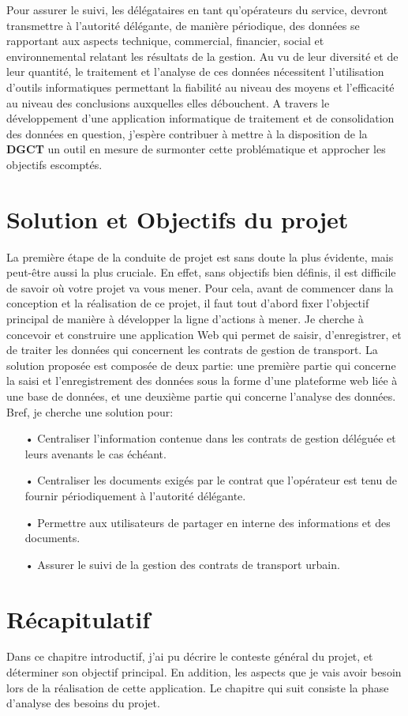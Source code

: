 Pour assurer le suivi, les délégataires en tant qu’opérateurs du service, devront transmettre à l’autorité délégante, de manière périodique, des données se rapportant aux aspects technique, commercial, financier, social et environnemental relatant les résultats de la gestion. Au vu de leur diversité et de leur quantité, le traitement et l’analyse de ces données nécessitent l’utilisation d’outils informatiques permettant la fiabilité au niveau des moyens et l’efficacité au niveau des conclusions auxquelles elles débouchent. A travers le développement d’une application informatique de traitement et de consolidation des données en question, j’espère contribuer à mettre à la disposition de la \textbf{DGCT} un outil en mesure de surmonter cette problématique et approcher les objectifs escomptés.

\section{Solution et Objectifs du projet}

La première étape de la conduite de projet est sans doute la plus évidente,
mais peut-être
aussi la plus cruciale. En effet, sans objectifs bien définis, il est
difficile de savoir où votre projet
va vous mener. Pour cela, avant de commencer dans la conception et la
réalisation de ce projet,
il faut tout d’abord fixer l’objectif principal de manière à développer la
ligne d’actions à mener.
Je cherche à concevoir et construire une application Web qui permet de
saisir, d'enregistrer,
et de traiter les données qui concernent les contrats de gestion de
transport. La
solution proposée est composée de deux partie: une première partie qui
concerne la
saisi et l'enregistrement des données sous la forme d'une plateforme web
liée à une base de données, et une deuxième partie qui concerne l'analyse des données.
Bref, je cherche une solution pour:
\begin{itemize}
	\item[•] Centraliser l’information contenue dans les contrats de gestion
	      déléguée et
	      leurs avenants le cas échéant.
	\item[•] Centraliser les documents exigés par le contrat que l’opérateur
	      est tenu de
	      fournir périodiquement à l’autorité délégante.
	\item[•] Permettre aux utilisateurs de partager en interne des
	      informations et des
	      documents.
	\item[•] Assurer le suivi de la gestion des contrats de transport urbain.
\end{itemize}
\section{Récapitulatif}
Dans ce chapitre introductif, j'ai pu décrire le conteste général du
projet, et
déterminer son objectif principal. En addition, les aspects que je vais
avoir besoin lors de la réalisation de cette application.
Le chapitre qui suit consiste la phase d'analyse des besoins du projet.